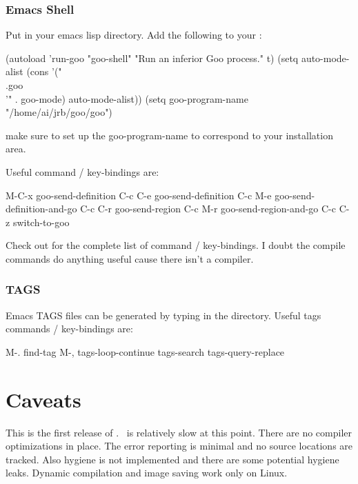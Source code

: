 \documentclass[twoside,twocolumn,9pt]{extarticle}
\begin{document}
\subsubsection{Emacs Shell}

Put  in your emacs lisp directory.  Add the
following to your :

\begin{exv}
(autoload 'run-goo  "goo-shell" "Run an inferior Goo process." t)
(setq auto-mode-alist
      (cons '("\\.goo\\'" . goo-mode) auto-mode-alist))
(setq goo-program-name "/home/ai/jrb/goo/goo") 
\end{exv}

make sure to set up the goo-program-name to correspond to your
installation area.

Useful command / key-bindings are:

\begin{exv}
M-C-x   goo-send-definition
C-c C-e goo-send-definition
C-c M-e goo-send-definition-and-go
C-c C-r goo-send-region
C-c M-r goo-send-region-and-go
C-c C-z switch-to-goo
\end{exv}

Check out  for the complete list of command /
key-bindings. I doubt the compile commands do anything useful cause
there isn't a compiler.

\subsubsection{TAGS}

Emacs TAGS files can be generated by typing  in
the  directory.  Useful tags commands / key-bindings are:

\begin{exv}
M-.     find-tag
M-,     tags-loop-continue
        tags-search
        tags-query-replace
\end{exv}

\section{Caveats} 

This is the first release of \goo.
\goo\ is relatively slow at this point.  There are no compiler
optimizations in place.  The error reporting is minimal and no source
locations are tracked.  Also hygiene is not implemented and there are
some potential hygiene leaks.  Dynamic compilation and image saving
work only on Linux.
\end{document}
